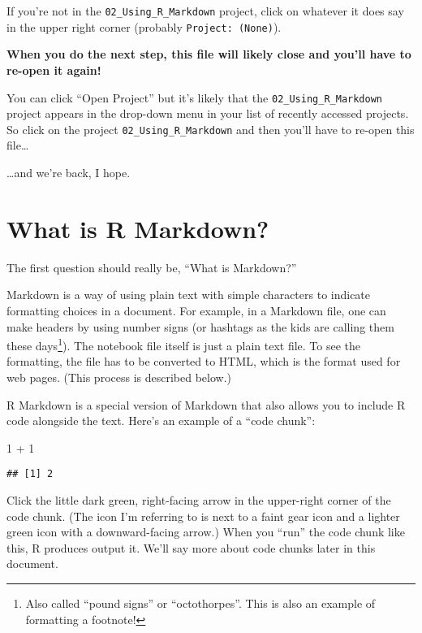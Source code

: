 \documentclass[
]{book}
\newenvironment{Shaded}{\begin{snugshade}}{\end{snugshade}}
\newcommand{\DecValTok}[1]{\textcolor[rgb]{0.00,0.00,0.81}{#1}}
\newcommand{\SpecialCharTok}[1]{\textcolor[rgb]{0.00,0.00,0.00}{#1}}
\begin{document}
If you're not in the \texttt{02\_Using\_R\_Markdown} project, click on whatever it does say in the upper right corner (probably \texttt{Project:\ (None)}).

\textbf{When you do the next step, this file will likely close and you'll have to re-open it again!}

You can click ``Open Project'' but it's likely that the \texttt{02\_Using\_R\_Markdown} project appears in the drop-down menu in your list of recently accessed projects. So click on the project \texttt{02\_Using\_R\_Markdown} and then you'll have to re-open this file\ldots{}

\ldots and we're back, I hope.

\hypertarget{rmark-whatis}{%
\section{What is R Markdown?}\label{rmark-whatis}}

The first question should really be, ``What is Markdown?''

Markdown is a way of using plain text with simple characters to indicate formatting choices in a document. For example, in a Markdown file, one can make headers by using number signs (or hashtags as the kids are calling them these days\footnote{Also called ``pound signs'' or ``octothorpes''. This is also an example of formatting a footnote!}). The notebook file itself is just a plain text file. To see the formatting, the file has to be converted to HTML, which is the format used for web pages. (This process is described below.)

R Markdown is a special version of Markdown that also allows you to include R code alongside the text. Here's an example of a ``code chunk'':

\begin{Shaded}
\begin{Highlighting}[]
\DecValTok{1} \SpecialCharTok{+} \DecValTok{1}
\end{Highlighting}
\end{Shaded}

\begin{verbatim}
## [1] 2
\end{verbatim}

Click the little dark green, right-facing arrow in the upper-right corner of the code chunk. (The icon I'm referring to is next to a faint gear icon and a lighter green icon with a downward-facing arrow.) When you ``run'' the code chunk like this, R produces output it. We'll say more about code chunks later in this document.
\end{document}
